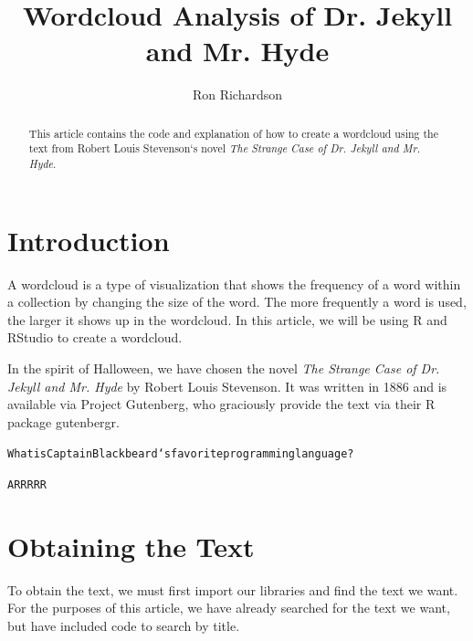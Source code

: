 \documentclass[draft]{article}\usepackage[]{graphicx}\usepackage[]{color}
\makeatletter
\newenvironment{kframe}{%
 \def\at@end@of@kframe{}%
 \ifinner\ifhmode%
  \def\at@end@of@kframe{\end{minipage}}%
  \begin{minipage}{\columnwidth}%
 \fi\fi%
 \def\FrameCommand##1{\hskip\@totalleftmargin \hskip-\fboxsep
 \colorbox{shadecolor}{##1}\hskip-\fboxsep
     \hskip-\linewidth \hskip-\@totalleftmargin \hskip\columnwidth}%
 \MakeFramed {\advance\hsize-\width
   \@totalleftmargin\z@ \linewidth\hsize
   \@setminipage}}%
 {\par\unskip\endMakeFramed%
 \at@end@of@kframe}
\newenvironment{knitrout}{}{} %
\makeatother
\begin{document}
\title{Wordcloud Analysis of Dr. Jekyll and Mr. Hyde}
\author{Ron Richardson}
\maketitle

\begin{abstract}
This article contains the code and explanation of how to create a wordcloud using the text from Robert Louis Stevenson`s novel \textit{The Strange Case of Dr. Jekyll and Mr. Hyde}.
\end{abstract}

\section{Introduction}
A wordcloud is a type of visualization that shows the frequency of a word within a collection by changing the size of the word. The more frequently a word is used, the larger it shows up in the wordcloud.  In this article, we will be using R and RStudio to create a wordcloud.

In the spirit of Halloween, we have chosen the novel \textit{The Strange Case of Dr. Jekyll and Mr. Hyde} by Robert Louis Stevenson. It was written in 1886 and is available via Project Gutenberg, who graciously provide the text via their R package gutenbergr.

\begin{knitrout}
\color{fgcolor}\begin{kframe}
\begin{alltt}
What is Captain Blackbeard`s favorite programming language?

ARRRRR
\end{alltt}
\end{kframe}
\end{knitrout}


\section{Obtaining the Text}
To obtain the text, we must first import our libraries and find the text we want. For the purposes of this article, we have already searched for the text we want, but have included code to search by title.
\end{document}
